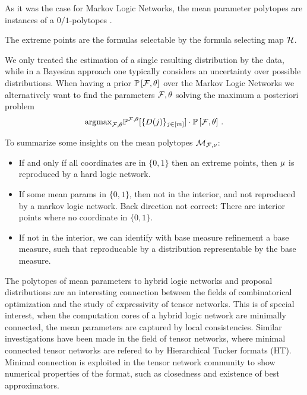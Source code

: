 As it was the case for Markov Logic Networks, the mean parameter polytopes are instances of a $0/1$-polytopes \cite{ziegler_lectures_2000,gillmann_01-polytopes_2007}.

The extreme points are the formulas selectable by the formula selecting map $\mathcal{H}$.



\begin{remark}
	We only treated the estimation of a single resulting distribution by the data, while in a Bayesian approach one typically considers an uncertainty over possible distributions.
	When having a prior $\mathbb{P}\left[\mathcal{F},\theta\right]$ over the Markov Logic Networks we alternatively want to find the parameters $\mathcal{F},\theta$ solving the maximum a posteriori problem
	\begin{align}
		\mathrm{argmax}_{\mathcal{F},\theta} \mathbb{P}^{\mathcal{F},\theta}[\{D(j)\}_{j\in[m]}]\cdot \mathbb{P}\left[\mathcal{F},\theta\right]\, .
	\end{align}
\end{remark}

To summarize some insights on the mean polytopes $\mathcal{M}_{\mathcal{F},\nu}$:
\begin{itemize}
	\item If and only íf all coordinates are in $\{0,1\}$ then an extreme points, then $\mu$ is reproduced by a hard logic network.
	\item If some mean params in $\{0,1\}$, then not in the interior, and not reproduced by a markov logic network.
		Back direction not correct: There are interior points where no coordinate in $\{0,1\}$.
	\item If not in the interior, we can identify with base measure refinement a base measure, such that reproducable by a distribution representable by the base measure.
\end{itemize}


The polytopes of mean parameters to hybrid logic networks and proposal distributions are an interesting connection between the fields of combinatorical optimization and the study of expressivity of tensor networks.
This is of special interest, when the computation cores of a hybrid logic network are minimally connected, the mean parameters are captured by local consistencies.
Similar investigations have been made in the field of tensor networks, where minimal connected tensor networks are refered to by Hierarchical Tucker formats (HT).
Minimal connection is exploited in the tensor network community to show numerical properties of the format, such as closedness and existence of best approximators.














